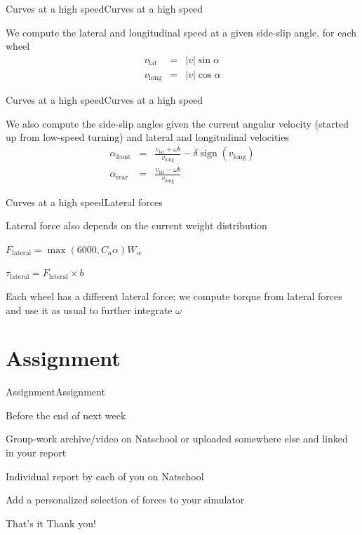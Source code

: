 \documentclass{beamer}
\DeclareMathOperator{\sign}{sign}
\begin{document}
\begin{slide}{Curves at a high speed}{Curves at a high speed}{
\item We compute the lateral and longitudinal speed at a given side-slip angle, for each wheel
\begin{eqnarray}
v_{\text{lat}} &=& |v| \sin \alpha \\
v_{\text{long}} &=& |v| \cos \alpha
\end{eqnarray}
}\end{slide}

\begin{slide}{Curves at a high speed}{Curves at a high speed}{
\item We also compute the side-slip angles given the current angular velocity (started up from low-speed turning) and lateral and longitudinal velocities
\begin{eqnarray}
\alpha_{\text{front}} &=& \frac{v_{\text{lat}} + \omega b}{v_{\text{long}}} - \delta \sign(v_{\text{long}}) \\
\alpha_{\text{rear}} &=& \frac{v_{\text{lat}} - \omega b}{v_{\text{long}}}
\end{eqnarray}
}\end{slide}

\begin{slide}{Curves at a high speed}{Lateral forces}{
\item Lateral force also depends on the current weight distribution 
\item $F_{\text{lateral}} = \max(6000, C_a \alpha) W_w$
\item $\tau_{\text{lateral}} = F_{\text{lateral}} \times b$
\item Each wheel has a different lateral force; we compute torque from lateral forces and use it as usual to further integrate $\omega$
}\end{slide}


\section{Assignment}
\begin{slide}{Assignment}{Assignment}{
\item Before the end of next week
\item Group-work archive/video on Natschool or uploaded somewhere else and linked in your report
\item Individual report by each of you on Natschool
\item Add a personalized selection of forces to your simulator
}\end{slide}

\begin{frame}{That's it}
\center
\fontsize{18pt}{7.2}\selectfont
Thank you!
\end{frame}
\end{document}
